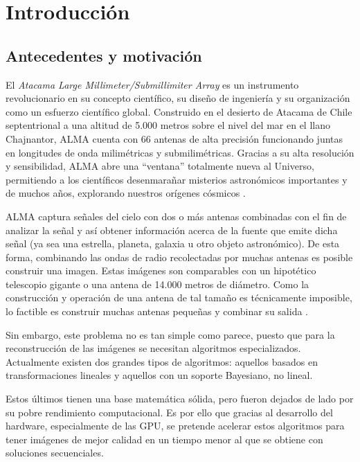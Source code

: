\chapter{Introducci\'on}
\label{cap:introduccion}

\section{Antecedentes y motivaci\'on}
\label{intro:motivacion}
El \textit{Atacama Large Millimeter/Submillimiter Array} es un instrumento revolucionario en su concepto científico, su diseño de ingeniería y su organización como un esfuerzo científico global. Construido en el desierto de Atacama de Chile septentrional a una altitud de 5.000 metros sobre el nivel del mar en el llano Chajnantor, ALMA cuenta con 66 antenas de alta precisión funcionando juntas en longitudes de onda milimétricas y submilimétricas. Gracias a su alta resolución y sensibilidad, ALMA abre una “ventana” totalmente nueva al Universo, permitiendo a los científicos desenmarañar misterios astronómicos importantes y de muchos años, explorando nuestros orígenes cósmicos \citep{alma}.

ALMA captura señales del cielo con dos o más antenas combinadas con el fin de analizar  la señal y así obtener información acerca de la fuente que emite dicha señal (ya sea una estrella, planeta, galaxia u otro objeto astronómico). De esta forma, combinando las ondas de radio recolectadas por muchas antenas es posible construir una imagen. Estas imágenes son comparables con un hipotético telescopio gigante o una antena de 14.000 metros de diámetro. Como la construcción y operación de una antena de tal tamaño es técnicamente imposible, lo factible es construir muchas antenas pequeñas y combinar su salida \citep{howalma}.

Sin embargo, este problema no es tan simple como parece, puesto que para la reconstrucción de las imágenes se necesitan algoritmos especializados. Actualmente existen dos grandes tipos de algoritmos: aquellos basados en transformaciones lineales y aquellos con un soporte Bayesiano, no lineal.

Estos últimos tienen una base matemática sólida, pero fueron dejados de lado por su pobre rendimiento computacional. Es por ello que gracias al desarrollo del hardware, especialmente de las GPU, se pretende acelerar estos algoritmos para tener imágenes de mejor calidad en un tiempo menor al que se obtiene con soluciones secuenciales.

